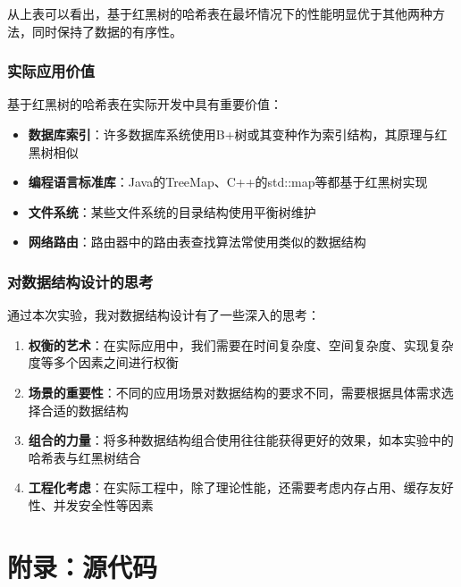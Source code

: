 \documentclass[12pt,a4paper]{article}
\begin{document}
从上表可以看出，基于红黑树的哈希表在最坏情况下的性能明显优于其他两种方法，同时保持了数据的有序性。

\subsubsection{实际应用价值}
基于红黑树的哈希表在实际开发中具有重要价值：

\begin{itemize}
\item \textbf{数据库索引}：许多数据库系统使用B+树或其变种作为索引结构，其原理与红黑树相似
\item \textbf{编程语言标准库}：Java的TreeMap、C++的std::map等都基于红黑树实现
\item \textbf{文件系统}：某些文件系统的目录结构使用平衡树维护
\item \textbf{网络路由}：路由器中的路由表查找算法常使用类似的数据结构
\end{itemize}

\subsubsection{对数据结构设计的思考}
通过本次实验，我对数据结构设计有了一些深入的思考：

\begin{enumerate}
\item \textbf{权衡的艺术}：在实际应用中，我们需要在时间复杂度、空间复杂度、实现复杂度等多个因素之间进行权衡
\item \textbf{场景的重要性}：不同的应用场景对数据结构的要求不同，需要根据具体需求选择合适的数据结构
\item \textbf{组合的力量}：将多种数据结构组合使用往往能获得更好的效果，如本实验中的哈希表与红黑树结合
\item \textbf{工程化考虑}：在实际工程中，除了理论性能，还需要考虑内存占用、缓存友好性、并发安全性等因素
\end{enumerate}

\section{附录：源代码}
\end{document}
